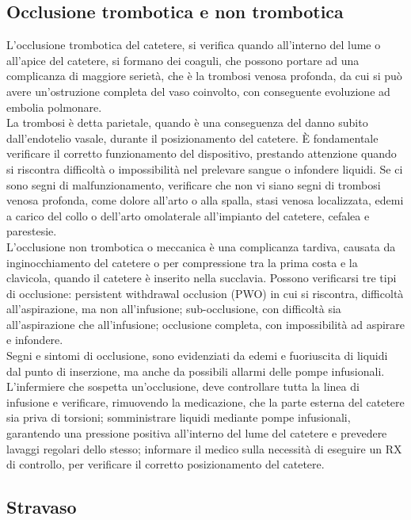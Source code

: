\subsection{Occlusione trombotica e non trombotica}

L’occlusione trombotica del catetere, si verifica quando all’interno del lume o all’apice del catetere, si formano dei 
coaguli, che possono portare ad una complicanza di maggiore serietà, che è la trombosi venosa profonda, da cui si può 
avere un’ostruzione completa del vaso coinvolto, con conseguente evoluzione ad embolia polmonare.\\ La trombosi è 
detta parietale, quando è una conseguenza del danno subito dall'endotelio vasale, durante il posizionamento del 
catetere. È fondamentale verificare il corretto funzionamento del dispositivo, prestando attenzione quando si 
riscontra difficoltà o impossibilità nel prelevare sangue o infondere liquidi. Se ci sono segni di malfunzionamento, 
verificare che non vi siano segni di trombosi venosa profonda, come dolore all’arto o alla spalla, stasi venosa 
localizzata, edemi a carico del collo o dell’arto omolaterale all’impianto del catetere, cefalea e parestesie.\\
L’occlusione non trombotica o meccanica è una complicanza tardiva, causata da inginocchiamento del catetere o 
per compressione tra la prima costa e la clavicola, quando il catetere è inserito nella succlavia. Possono verificarsi 
tre tipi di occlusione: persistent withdrawal occlusion (PWO) in cui si riscontra, difficoltà all’aspirazione, ma non 
all’infusione; sub-occlusione, con difficoltà sia all’aspirazione che all’infusione; occlusione completa, con 
impossibilità ad aspirare e infondere\cite{AIOMCVC}.\\
Segni e sintomi di occlusione, sono evidenziati da edemi e fuoriuscita di liquidi dal punto di inserzione, ma 
anche da possibili allarmi delle pompe infusionali.\\ L’infermiere che sospetta un’occlusione, deve controllare tutta la 
linea di infusione e verificare, rimuovendo la medicazione, che la parte esterna del catetere sia priva di torsioni; 
somministrare liquidi mediante pompe infusionali, garantendo una pressione positiva all’interno del lume del catetere e 
prevedere lavaggi regolari dello stesso; informare il medico sulla necessità di eseguire un RX di controllo, per 
verificare il corretto posizionamento del catetere.

\subsection{Stravaso}

